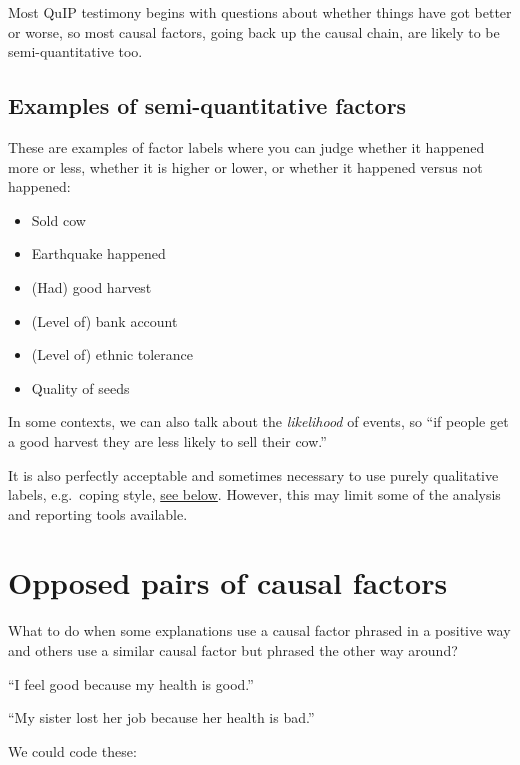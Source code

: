 \documentclass[
]{book}
\providecommand{\tightlist}{%
  \setlength{\itemsep}{0pt}\setlength{\parskip}{0pt}}
\begin{document}
Most QuIP testimony begins with questions about whether things have got better or worse, so most causal factors, going back up the causal chain, are likely to be semi-quantitative too.

\hypertarget{examples-of-semi-quantitative-factors}{%
\subsection{Examples of semi-quantitative factors}\label{examples-of-semi-quantitative-factors}}

These are examples of factor labels where you can judge whether it happened more or less, whether it is higher or lower, or whether it happened versus not happened:

\begin{itemize}
\tightlist
\item
  Sold cow
\item
  Earthquake happened
\item
  (Had) good harvest
\item
  (Level of) bank account
\item
  (Level of) ethnic tolerance
\item
  Quality of seeds
\end{itemize}

In some contexts, we can also talk about the \emph{likelihood} of events, so ``if people get a good harvest they are less likely to sell their cow.''

It is also perfectly acceptable and sometimes necessary to use purely qualitative labels, e.g.~coping style, \href{https://guide.causalmap.app/creating.html\#examples-of-non-quantitative-factors}{see below}. However, this may limit some of the analysis and reporting tools available.

\hypertarget{opposed-pairs-of-causal-factors}{%
\section{Opposed pairs of causal factors}\label{opposed-pairs-of-causal-factors}}

What to do when some explanations use a causal factor phrased in a positive way and others use a similar causal factor but phrased the other way around?

``I feel good because my health is good.''

``My sister lost her job because her health is bad.''

We could code these:
\end{document}

